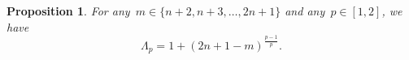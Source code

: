 \documentclass{article}
\numberwithin{equation}{section}
\theoremstyle{definition}
\theoremstyle{plain}
\newtheorem{proposition}{Proposition}[section]
\theoremstyle{remark}
\newcommand*{\abs}[2][]{#1\lvert#2#1\rvert}
\newcommand*{\lagp}[1][]{L\ifblank{#1}{}{_{#1}}}
\newcommand*{\norm}[2][]{#1\lVert#2#1\rVert}
\newcommand*{\set}[2][]{#1\{#2#1\}}
\begin{document}


\begin{proposition}
    \label{prop:lambda-p-2}
    For any~$m \in \set{n + 2, n + 3, \dots, 2n + 1}$ and any~$p\in[1,2]$, we have
    \begin{equation}
        \label{eq:lambda-p-2}
        \Lambda_p = 1 + (2n + 1 - m)^{\frac{p-1}{p}}.
    \end{equation}
\end{proposition}
\end{document}

